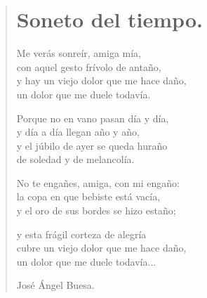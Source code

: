 \documentclass[11pt, portrait, twoside, notitlepage, openright]{book}
\begin{document}
\newpage
\begin{verse}
\begin{center}
\section{Soneto del tiempo.}
\end{center}
Me verás sonreír, amiga mía,\\
con aquel gesto frívolo de antaño,\\
y hay un viejo dolor que me hace daño,\\
un dolor que me duele todavía.
\newline

Porque no en vano pasan día y día,\\
y día a día llegan año y año,\\
y el júbilo de ayer se queda huraño\\
de soledad y de melancolía.
\newline

No te engañes, amiga, con mi engaño:\\
la copa en que bebiste está vacía,\\
y el oro de sus bordes se hizo estaño;
\newline

y esta frágil corteza de alegría\\
cubre un viejo dolor que me hace daño,\\
un dolor que me duele todavía...
\newline

José Ángel Buesa.
\end{verse}
\end{document}
